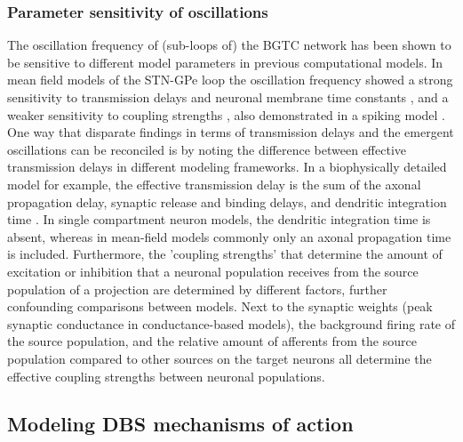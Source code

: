 %
%
%
%
%
%
%
%
%
%
%
%
%
%

%
\subsubsection{Parameter sensitivity of oscillations}

%
The oscillation frequency of (sub-loops of) the BGTC network has been shown to be
sensitive to different model parameters in previous computational models.
In mean field models of the STN-GPe loop the oscillation frequency showed a
strong sensitivity to transmission delays and neuronal membrane time constants \cite{holgado_conditions_2010,lienard_beta-band_2017}, and a weaker sensitivity
to coupling strengths \cite{holgado_conditions_2010,pavlides_computational_2015,liu_neural_2017},
also demonstrated in a spiking model \cite{wei_role_2015}.
One way that disparate findings in terms of transmission delays and the emergent oscillations
can be reconciled is by noting the difference between effective transmission delays
in different modeling frameworks. In a biophysically detailed model for example, the
effective transmission delay is the sum of the axonal propagation delay, synaptic
release and binding delays, and dendritic integration time \cite{kumar_role_2011}.
In single compartment neuron models, the dendritic integration time is absent, whereas
in mean-field models commonly only an axonal propagation time is included.
Furthermore, the 'coupling strengths' that determine the amount of excitation or
inhibition that a neuronal population receives from the source population of
a projection are determined by different factors, further confounding comparisons
between models. Next to the synaptic weights (peak synaptic conductance in
conductance-based models), the background firing rate of the source population,
and the relative amount of afferents from the source population compared to other
sources on the target neurons all determine the effective coupling strengths
between neuronal populations.

%
%

%
\subsection{Modeling DBS mechanisms of action}
%
%
%
%
%
%
%
%
%
%
%
%
%
%
%
%
%
%
%
%
%
%
%

